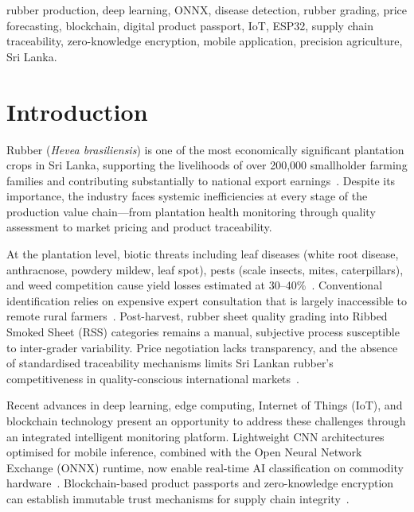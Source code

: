 \documentclass[10pt, conference]{IEEEtran}
\begin{document}
\begin{IEEEkeywords}
rubber production, deep learning, ONNX, disease detection, rubber
grading, price forecasting, blockchain, digital product passport,
IoT, ESP32, supply chain traceability, zero-knowledge encryption,
mobile application, precision agriculture, Sri Lanka.
\end{IEEEkeywords}

\section{Introduction}

Rubber (\textit{Hevea brasiliensis}) is one of the most economically
significant plantation crops in Sri Lanka, supporting the livelihoods
of over 200,000 smallholder farming families and contributing
substantially to national export earnings~\cite{cbsl2024}. Despite its
importance, the industry faces systemic inefficiencies at every stage
of the production value chain---from plantation health monitoring
through quality assessment to market pricing and product
traceability.

At the plantation level, biotic threats including leaf diseases (white
root disease, anthracnose, powdery mildew, leaf spot), pests (scale
insects, mites, caterpillars), and weed competition cause yield losses
estimated at 30--40\%~\cite{rrisl2024}. Conventional identification
relies on expensive expert consultation that is largely inaccessible
to remote rural farmers~\cite{doa2024}. Post-harvest, rubber sheet
quality grading into Ribbed Smoked Sheet (RSS) categories remains a
manual, subjective process susceptible to inter-grader variability.
Price negotiation lacks transparency, and the absence of standardised
traceability mechanisms limits Sri Lankan rubber's competitiveness in
quality-conscious international markets~\cite{jayasinghe2024}.

Recent advances in deep learning, edge computing, Internet of Things
(IoT), and blockchain technology present an opportunity to address
these challenges through an integrated intelligent monitoring
platform. Lightweight CNN architectures optimised for mobile
inference, combined with the Open Neural Network Exchange (ONNX)
runtime, now enable real-time AI classification on commodity
hardware~\cite{tan2019}. Blockchain-based product passports and
zero-knowledge encryption can establish immutable trust mechanisms for
supply chain integrity~\cite{casino2019}.
\end{document}
